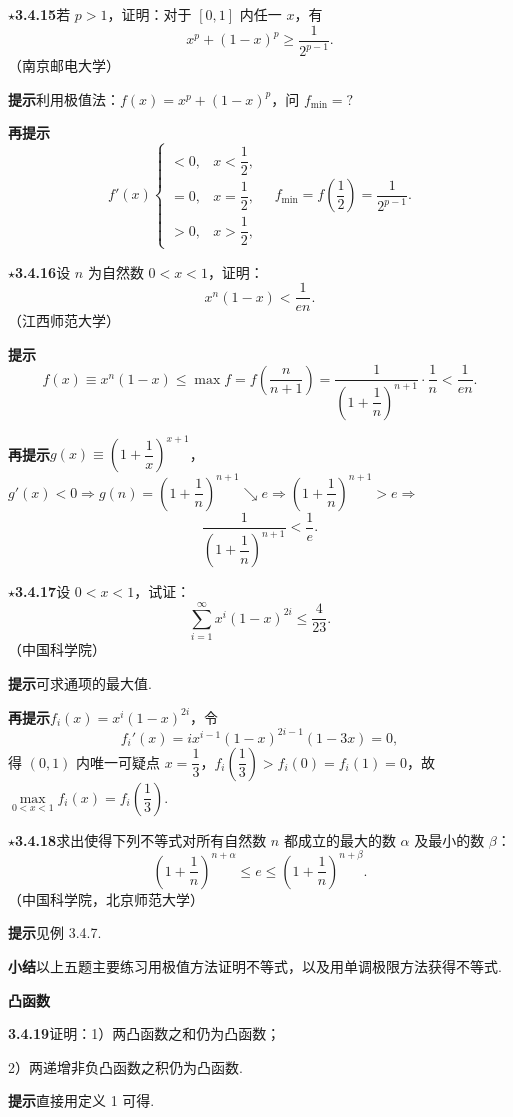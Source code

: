 \documentclass[UTF8, 12pt, fontset=fandol, oneside]{ctexart}
\begin{document}
\noindent\textbf{$\star$3.4.15}\quad 若 $p>1$，证明：对于 $[0,1]$ 内任一 $x$，有
\[
  x^p+(1-x)^p\ge\frac1{2^{p-1}}.
\]
（南京邮电大学）

\noindent\textbf{提示}\quad 利用极值法：$f(x)=x^p+(1-x)^p$，问 $f_{\min}=?$

\noindent\textbf{再提示}\quad
\[
f'(x)
\begin{cases}
<0, & x<\dfrac12,\\
=0, & x=\dfrac12,\\
>0, & x>\dfrac12,
\end{cases}
\quad
f_{\min}=f\left(\frac12\right)=\frac1{2^{p-1}}.
\]

\noindent\textbf{$\star$3.4.16}\quad 设 $n$ 为自然数 $0<x<1$，证明：
\[
  x^n(1-x)<\frac1{en}.
\]
（江西师范大学）

\noindent\textbf{提示}\quad
\[
  f(x)\equiv x^n(1-x)\le\max f=f\left(\frac n{n+1}\right)
  =\frac1{\left(1+\dfrac1n\right)^{n+1}}\cdot\frac1n<\frac1{en}.
\]

\noindent\textbf{再提示}\quad $g(x)\equiv\left(1+\dfrac1x\right)^{x+1}$，$g'(x)<0\Rightarrow g(n)=\left(1+\dfrac1n\right)^{n+1}\searrow e\Rightarrow\left(1+\dfrac1n\right)^{n+1}>e\Rightarrow$
\[
  \frac1{\left(1+\dfrac1n\right)^{n+1}}<\frac1e.
\]

\noindent\textbf{$\star$3.4.17}\quad 设 $0<x<1$，试证：
\[
  \sum_{i=1}^\infty x^i(1-x)^{2i}\le\frac4{23}.
\]
（中国科学院）

\noindent\textbf{提示}\quad 可求通项的最大值.

\noindent\textbf{再提示}\quad $f_i(x)=x^i(1-x)^{2i}$，令
\[
  f_i'(x)=ix^{i-1}(1-x)^{2i-1}(1-3x)=0,
\]
得 $(0,1)$ 内唯一可疑点 $x=\dfrac13$，$f_i\left(\dfrac13\right)>f_i(0)=f_i(1)=0$，故 $\max\limits_{0<x<1}f_i(x)=f_i\left(\dfrac13\right)$.

\noindent\textbf{$\star$3.4.18}\quad 求出使得下列不等式对所有自然数 $n$ 都成立的最大的数 $\alpha$ 及最小的数 $\beta$：
\[
  \left(1+\frac1n\right)^{n+\alpha}\le e\le
  \left(1+\frac1n\right)^{n+\beta}.
\]
（中国科学院，北京师范大学）

\noindent\textbf{提示}\quad 见例 3.4.7.

\noindent\textbf{小结}\quad 以上五题主要练习用极值方法证明不等式，以及用单调极限方法获得不等式.

\noindent\textbf{凸函数}

\noindent\textbf{3.4.19}\quad 证明：1）两凸函数之和仍为凸函数；

2）两递增非负凸函数之积仍为凸函数.

\noindent\textbf{提示}\quad 直接用定义 1 可得.
\end{document}
